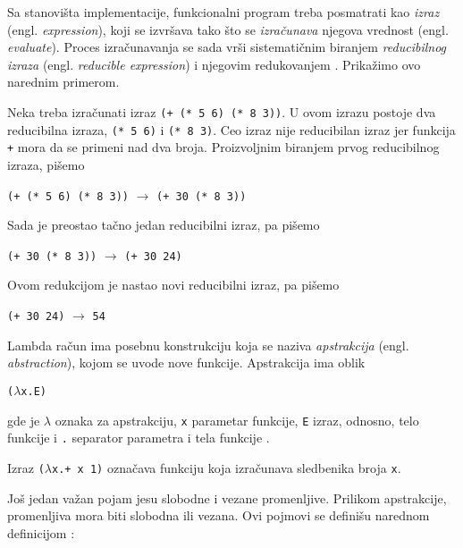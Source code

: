 Sa stanovišta implementacije, funkcionalni program treba posmatrati kao \textit{izraz} (engl. \textit{expression}), koji se izvršava tako što se \textit{izračunava} njegova vrednost (engl. \textit{evaluate}). Proces izračunavanja se sada vrši sistematičnim biranjem \textit{reducibilnog izraza} (engl. \textit{reducible expression}) i njegovim redukovanjem \cite{the-implementation-of-functional-programming-languages}. Prikažimo ovo narednim primerom.

\begin{primer}
	Neka treba izračunati izraz \verb|(+ (* 5 6) (* 8 3))|. U ovom izrazu postoje dva reducibilna izraza, \verb|(* 5 6)| i \verb|(* 8 3)|. Ceo izraz nije reducibilan izraz jer funkcija \verb|+| mora da se primeni nad dva broja. Proizvoljnim biranjem prvog reducibilnog izraza, pišemo
	\begin{center}
		\verb|(+ (* 5 6) (* 8 3))| $\rightarrow$ \verb|(+ 30 (* 8 3))|
	\end{center}
	Sada je preostao tačno jedan reducibilni izraz, pa pišemo
	\begin{center}
		\verb|(+ 30 (* 8 3))| $\rightarrow$ \verb|(+ 30 24)|
	\end{center}
	Ovom redukcijom je nastao novi reducibilni izraz, pa pišemo
	\begin{center}
		\verb|(+ 30 24)| $\rightarrow$ \verb|54|
	\end{center}
\end{primer}

Lambda račun ima posebnu konstrukciju koja se naziva \textit{apstrakcija} (engl. \textit{abstraction}), kojom se uvode nove funkcije. Apstrakcija ima oblik
\begin{center}
	\verb|(|$\lambda$\verb|x.E)|
\end{center} 
gde je $\lambda$ oznaka za apstrakciju, \verb|x| parametar funkcije, \verb|E| izraz, odnosno, telo funkcije i \verb|.| separator parametra i tela funkcije \cite{the-implementation-of-functional-programming-languages}.  
\begin{primer}
	Izraz \verb|(|$\lambda$\verb|x.+ x 1)| označava funkciju koja izračunava sledbenika broja \verb|x|.
\end{primer}

Još jedan važan pojam jesu slobodne i vezane promenljive. Prilikom apstrakcije, promenljiva mora biti slobodna ili vezana. Ovi pojmovi se definišu narednom definicijom \cite{the-implementation-of-functional-programming-languages}:

